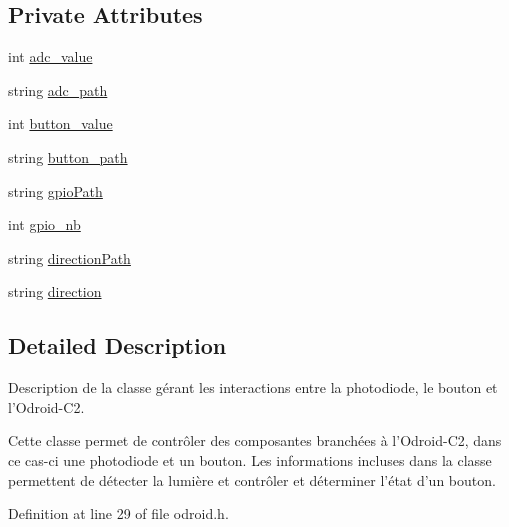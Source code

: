 \subsection*{Private Attributes}
\begin{DoxyCompactItemize}
\item 
int \hyperlink{classOdroid_aeb57a9bb759c9c45cd5fb5a90ea75a0a}{adc\-\_\-value}
\item 
string \hyperlink{classOdroid_a93391450090b2f8676e261bb6f8ac961}{adc\-\_\-path}
\item 
int \hyperlink{classOdroid_a9d14734cc57d1a962b7b214f84376727}{button\-\_\-value}
\item 
string \hyperlink{classOdroid_af5c8c0acd24f1d38ae2181a4d659ecd8}{button\-\_\-path}
\item 
string \hyperlink{classOdroid_af59f177765cdc44dd1bca01f1d2e568c}{gpio\-Path}
\item 
int \hyperlink{classOdroid_a936074d84ad18c34e19ee1f1ea59fcbf}{gpio\-\_\-nb}
\item 
string \hyperlink{classOdroid_aa74658114a7f7d6d31dba4b7e7955674}{direction\-Path}
\item 
string \hyperlink{classOdroid_acb053e5e5f9060d7884abf6dd6c29358}{direction}
\end{DoxyCompactItemize}


\subsection{Detailed Description}
Description de la classe gérant les interactions entre la photodiode, le bouton et l'Odroid-\/\-C2. 

Cette classe permet de contrôler des composantes branchées à l'Odroid-\/\-C2, dans ce cas-\/ci une photodiode et un bouton. Les informations incluses dans la classe permettent de détecter la lumière et contrôler et déterminer l'état d'un bouton. 

Definition at line 29 of file odroid.\-h.



